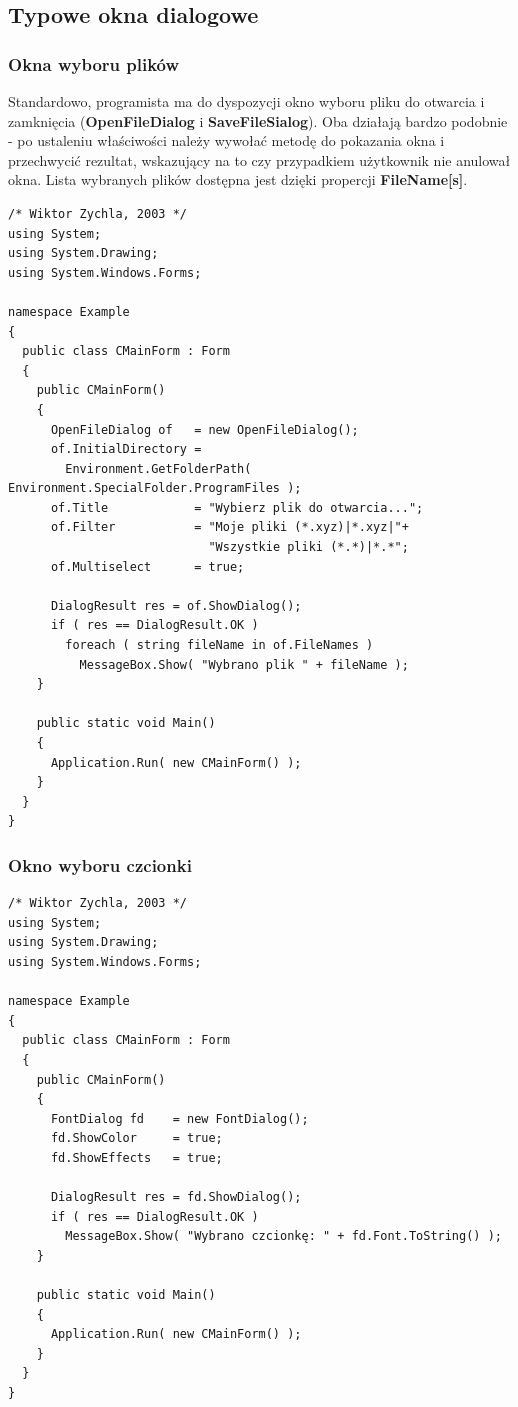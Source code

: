 \subsection{Typowe okna dialogowe}

\subsubsection{Okna wyboru plików}

Standardowo, programista ma do dyspozycji okno wyboru pliku do otwarcia i zamknięcia
({\bf OpenFileDialog} i {\bf SaveFileSialog}). Oba działają
bardzo podobnie - po ustaleniu właściwości należy wywołać metodę do pokazania okna i
przechwycić rezultat, wskazujący na to czy przypadkiem użytkownik nie anulował okna. 
Lista wybranych plików dostępna jest dzięki propercji {\bf FileName[s]}.

\begin{scriptsize}
\begin{verbatim}
/* Wiktor Zychla, 2003 */
using System;
using System.Drawing;
using System.Windows.Forms;

namespace Example
{
  public class CMainForm : Form
  {  
    public CMainForm() 
    {
      OpenFileDialog of   = new OpenFileDialog();
      of.InitialDirectory = 
        Environment.GetFolderPath( Environment.SpecialFolder.ProgramFiles );
      of.Title            = "Wybierz plik do otwarcia...";
      of.Filter           = "Moje pliki (*.xyz)|*.xyz|"+
                            "Wszystkie pliki (*.*)|*.*";
      of.Multiselect      = true;

      DialogResult res = of.ShowDialog();
      if ( res == DialogResult.OK )
        foreach ( string fileName in of.FileNames )
          MessageBox.Show( "Wybrano plik " + fileName );
    }

    public static void Main()
    {    
      Application.Run( new CMainForm() );
    }
  }
}
\end{verbatim}
\end{scriptsize}

\subsubsection{Okno wyboru czcionki}

\begin{scriptsize}
\begin{verbatim}
/* Wiktor Zychla, 2003 */
using System;
using System.Drawing;
using System.Windows.Forms;

namespace Example
{
  public class CMainForm : Form
  {  
    public CMainForm() 
    {
      FontDialog fd    = new FontDialog();
      fd.ShowColor     = true;
      fd.ShowEffects   = true;

      DialogResult res = fd.ShowDialog();
      if ( res == DialogResult.OK )
        MessageBox.Show( "Wybrano czcionkę: " + fd.Font.ToString() );
    }

    public static void Main()
    {    
      Application.Run( new CMainForm() );
    }
  }
}
\end{verbatim}
\end{scriptsize}

